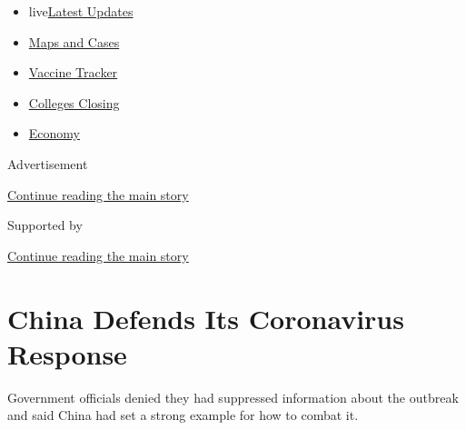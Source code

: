 \begin{itemize}
\tightlist
\item
  live\href{https://www.nytimes3xbfgragh.onion/2020/08/20/world/coronavirus-covid.html?name=styln-coronavirus-national\&region=TOP_BANNER\&variant=undefined\&block=storyline_menu_recirc\&action=click\&pgtype=Article\&impression_id=a18e0990-e384-11ea-a237-f96f036501c6}{Latest
  Updates}
\item
  \href{https://www.nytimes3xbfgragh.onion/interactive/2020/us/coronavirus-us-cases.html?name=styln-coronavirus-national\&region=TOP_BANNER\&variant=undefined\&block=storyline_menu_recirc\&action=click\&pgtype=Article\&impression_id=a18e0991-e384-11ea-a237-f96f036501c6}{Maps
  and Cases}
\item
  \href{https://www.nytimes3xbfgragh.onion/interactive/2020/science/coronavirus-vaccine-tracker.html?name=styln-coronavirus-national\&region=TOP_BANNER\&variant=undefined\&block=storyline_menu_recirc\&action=click\&pgtype=Article\&impression_id=a18e0992-e384-11ea-a237-f96f036501c6}{Vaccine
  Tracker}
\item
  \href{https://www.nytimes3xbfgragh.onion/2020/08/19/us/colleges-closing-covid.html?name=styln-coronavirus-national\&region=TOP_BANNER\&variant=undefined\&block=storyline_menu_recirc\&action=click\&pgtype=Article\&impression_id=a18e0993-e384-11ea-a237-f96f036501c6}{Colleges
  Closing}
\item
  \href{https://www.nytimes3xbfgragh.onion/live/2020/08/20/business/stock-market-today-coronavirus?name=styln-coronavirus-national\&region=TOP_BANNER\&variant=undefined\&block=storyline_menu_recirc\&action=click\&pgtype=Article\&impression_id=a18e0994-e384-11ea-a237-f96f036501c6}{Economy}
\end{itemize}

Advertisement

\protect\hyperlink{after-top}{Continue reading the main story}

Supported by

\protect\hyperlink{after-sponsor}{Continue reading the main story}

\hypertarget{china-defends-its-coronavirus-response}{%
\section{China Defends Its Coronavirus
Response}\label{china-defends-its-coronavirus-response}}

Government officials denied they had suppressed information about the
outbreak and said China had set a strong example for how to combat it.

